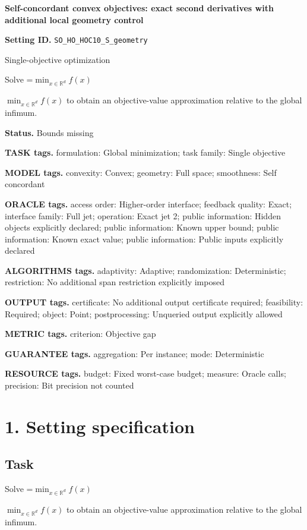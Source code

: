 \documentclass[10pt,a4paper]{article}
\newcommand{\AtlasMath}[1]{\par\begingroup\centering\setbox0=\hbox{$\displaystyle #1$}\ifdim\wd0>1.4\linewidth\typeout{ATLAS WIDE FORMULA: \the\wd0}\fi\ifdim\wd0>\linewidth\resizebox{\linewidth}{!}{\box0}\else\box0\fi\par\endgroup}
\newcommand{\AtlasInlineMath}[1]{\begingroup\setbox0=\hbox{$#1$}\ifdim\wd0>.4\linewidth\endgroup\AtlasMath{#1}\else\endgroup$#1$\fi}
\begin{document}
\raggedright

{\LARGE\bfseries\sffamily\color{AtlasNavy} Self-concordant convex objectives: exact second derivatives with additional local geometry control\par}\vspace{5pt}
\textbf{Setting ID.} \texttt{SO\_\allowbreak{}HO\_\allowbreak{}HOC10\_\allowbreak{}S\_\allowbreak{}geometry}

Single-objective optimization

Solve \AtlasInlineMath{\min_{x\in \mathbb{R}^d}f(x)} to obtain an objective-value approximation relative to the global infimum.

\textbf{Status.} Bounds missing

\textbf{TASK tags.} formulation: Global minimization; task family: Single objective

\textbf{MODEL tags.} convexity: Convex; geometry: Full space; smoothness: Self concordant

\textbf{ORACLE tags.} access order: Higher-order interface; feedback quality: Exact; interface family: Full jet; operation: Exact jet 2; public information: Hidden objects explicitly declared; public information: Known upper bound; public information: Known exact value; public information: Public inputs explicitly declared

\textbf{ALGORITHMS tags.} adaptivity: Adaptive; randomization: Deterministic; restriction: No additional span restriction explicitly imposed

\textbf{OUTPUT tags.} certificate: No additional output certificate required; feasibility: Required; object: Point; postprocessing: Unqueried output explicitly allowed

\textbf{METRIC tags.} criterion: Objective gap

\textbf{GUARANTEE tags.} aggregation: Per instance; mode: Deterministic

\textbf{RESOURCE tags.} budget: Fixed worst-case budget; measure: Oracle calls; precision: Bit precision not counted

\section{1. Setting specification}
\subsection{Task}
Solve \AtlasInlineMath{\min_{x\in \mathbb{R}^d}f(x)} to obtain an objective-value approximation relative to the global infimum.
\end{document}
